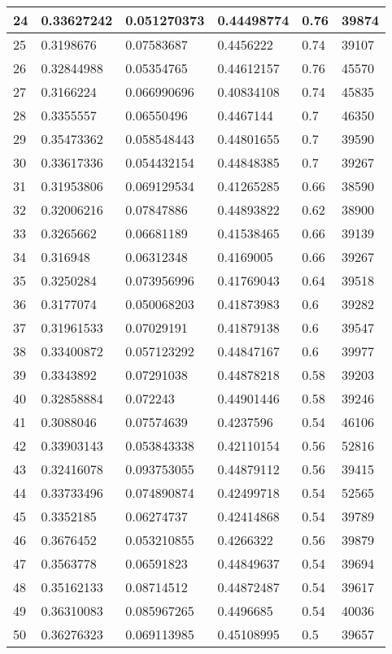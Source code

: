 \begin{longtable}{|l|l|l|l|l|l|}
24 & 0.33627242 & 0.051270373 & 0.44498774 & 0.76 & 39874 \\ \hline 
25 & 0.3198676 & 0.07583687 & 0.4456222 & 0.74 & 39107 \\ \hline 
26 & 0.32844988 & 0.05354765 & 0.44612157 & 0.76 & 45570 \\ \hline 
27 & 0.3166224 & 0.066990696 & 0.40834108 & 0.74 & 45835 \\ \hline 
28 & 0.3355557 & 0.06550496 & 0.4467144 & 0.7 & 46350 \\ \hline 
29 & 0.35473362 & 0.058548443 & 0.44801655 & 0.7 & 39590 \\ \hline 
30 & 0.33617336 & 0.054432154 & 0.44848385 & 0.7 & 39267 \\ \hline 
31 & 0.31953806 & 0.069129534 & 0.41265285 & 0.66 & 38590 \\ \hline 
32 & 0.32006216 & 0.07847886 & 0.44893822 & 0.62 & 38900 \\ \hline 
33 & 0.3265662 & 0.06681189 & 0.41538465 & 0.66 & 39139 \\ \hline 
34 & 0.316948 & 0.06312348 & 0.4169005 & 0.66 & 39267 \\ \hline 
35 & 0.3250284 & 0.073956996 & 0.41769043 & 0.64 & 39518 \\ \hline 
36 & 0.3177074 & 0.050068203 & 0.41873983 & 0.6 & 39282 \\ \hline 
37 & 0.31961533 & 0.07029191 & 0.41879138 & 0.6 & 39547 \\ \hline 
38 & 0.33400872 & 0.057123292 & 0.44847167 & 0.6 & 39977 \\ \hline 
39 & 0.3343892 & 0.07291038 & 0.44878218 & 0.58 & 39203 \\ \hline 
40 & 0.32858884 & 0.072243 & 0.44901446 & 0.58 & 39246 \\ \hline 
41 & 0.3088046 & 0.07574639 & 0.4237596 & 0.54 & 46106 \\ \hline 
42 & 0.33903143 & 0.053843338 & 0.42110154 & 0.56 & 52816 \\ \hline 
43 & 0.32416078 & 0.093753055 & 0.44879112 & 0.56 & 39415 \\ \hline 
44 & 0.33733496 & 0.074890874 & 0.42499718 & 0.54 & 52565 \\ \hline 
45 & 0.3352185 & 0.06274737 & 0.42414868 & 0.54 & 39789 \\ \hline 
46 & 0.3676452 & 0.053210855 & 0.4266322 & 0.56 & 39879 \\ \hline 
47 & 0.3563778 & 0.06591823 & 0.44849637 & 0.54 & 39694 \\ \hline 
48 & 0.35162133 & 0.08714512 & 0.44872487 & 0.54 & 39617 \\ \hline 
49 & 0.36310083 & 0.085967265 & 0.4496685 & 0.54 & 40036 \\ \hline 
50 & 0.36276323 & 0.069113985 & 0.45108995 & 0.5 & 39657 \\ \hline 
\end{longtable}